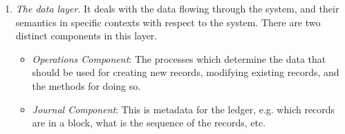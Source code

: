 \begin{enumerate}
	\item{\em The data layer}. It deals with the data flowing through the system, and their semantics in specific contexts with 
		respect to the system. There are two distinct components in this layer.

		\begin{itemize}
			\item {\em Operations Component}: The processes which determine the data that should be used for creating new 
				records, modifying existing records, and the methods for doing so. 
			\item {\em Journal Component}: This is metadata for the ledger, e.g. which records are in a block, what is the 
				sequence of the records, etc.
		\end{itemize}

\end{enumerate}


